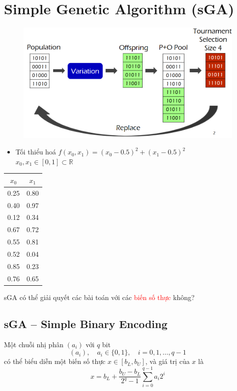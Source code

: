 \documentclass{book}
\begin{document}
\chapter{Simple Genetic Algorithm (sGA)}
\begin{figure}[H]
    \centering
    \includegraphics[width=0.75\linewidth]{images/GA-3_1.png}
\end{figure}

\begin{itemize}
    \item Tối thiểu hoá $f(x_0, x_1) = (x_0 - 0.5)^2 + (x_1 - 0.5)^2$
    \\ $x_0, x_1 \in [0,1] \subset \mathbb{R}$

\end{itemize}

\begin{table}[h!]
    \centering
    \begin{tabular}{|c|c|}
    \hline
    \textbf{$x_0$} & \textbf{$x_1$} \\
    \hline
    0.25 & 0.80 \\
    0.40 & 0.97 \\
    0.12 & 0.34 \\
    0.67 & 0.72 \\
    0.55 & 0.81 \\
    0.52 & 0.04 \\
    0.85 & 0.23 \\
    0.76 & 0.65 \\
    \hline
    \end{tabular}
\end{table}

sGA có thể giải quyết các bài toán với các \textcolor{red}{biến số thực} không?

\section{sGA – Simple Binary Encoding}

Một chuỗi nhị phân $(a_i)$ với $q$ bit
\[
(a_i), \quad a_i \in \{0,1\}, \quad i = 0,1, \dots, q-1
\]
có thể biểu diễn một biến số thực $x \in [b_L, b_U]$, và giá trị của $x$ là
\[
x = b_L + \frac{b_U - b_L}{2^q - 1} \sum_{i=0}^{q-1} a_i 2^i
\]
\end{document}
